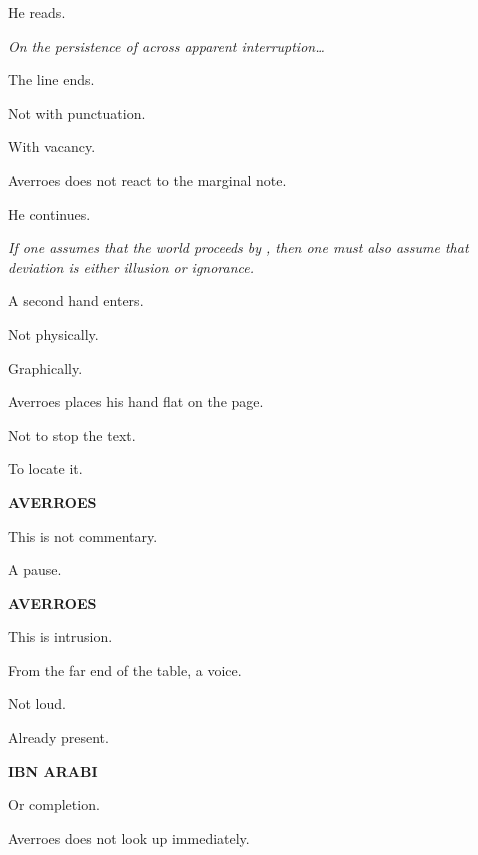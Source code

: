 He reads.

\medskip

\textit{On the persistence of  across apparent interruption\ldots}

\medskip

The line ends.

Not with punctuation.

With vacancy.

\medskip


\medskip

Averroes does not react to the marginal note.

He continues.

\medskip

\textit{If one assumes that the world proceeds by , then one
must also assume that deviation is either illusion or ignorance.}

\medskip

A second hand enters.

Not physically.

Graphically.

\medskip


\medskip

Averroes places his hand flat on the page.

Not to stop the text.

To locate it.

\medskip

\textbf{AVERROES}

This is not commentary.

\medskip

A pause.

\medskip

\textbf{AVERROES}

This is intrusion.

\medskip

From the far end of the table, a voice.

Not loud.

Already present.

\medskip

\textbf{IBN ARABI}

Or completion.

\medskip

Averroes does not look up immediately.

